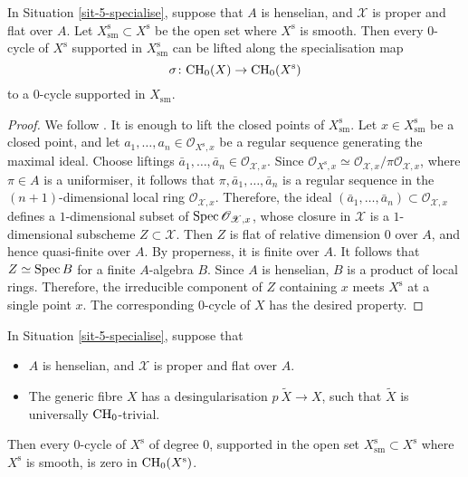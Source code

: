 \begin{lemma} \label{lem-5-lifting}
    In Situation \textup{\ref{sit-5-specialise}}, suppose that $A$ is henselian,
    and $\mathscr{X}$ is proper and flat over $A$.
    Let $X^{\mathrm{s}}_{\mathrm{sm}} \subset X^{\mathrm{s}}$ be the open set where $X^{\mathrm{s}}$ is smooth.
    Then every $0$-cycle of $X^{\mathrm{s}}$ supported in $X^{\mathrm{s}}_{\mathrm{sm}}$ 
    can be lifted along the specialisation map
    \[ \sigma \colon \mathrm{CH}_0 (X) \to \mathrm{CH}_0 (X^{\mathrm{s}}) \]
    to a $0$-cycle supported in $X_{\mathrm{sm}}$.
\end{lemma}

\begin{proof}
    We follow \cite[\S4]{EKW}.
    It is enough to lift the closed points of $X^{\mathrm{s}}_{\mathrm{sm}}$.
    Let $x \in X^{\mathrm{s}}_{\mathrm{sm}}$ be a closed point,
    and let $a_1, \dotsc, a_n \in \mathscr{O}_{X^{\mathrm{s}},x}$ be a regular sequence generating the maximal ideal.
    Choose liftings $\bar{a}_1, \dotsc, \bar{a}_n \in \mathscr{O}_{\mathscr{X},x}$.
    Since $\mathscr{O}_{X^{\mathrm{s}},x} \simeq \mathscr{O}_{\mathscr{X},x} / \pi \mathscr{O}_{\mathscr{X},x}$,
    where $\pi \in A$ is a uniformiser,
    it follows that $\pi, \bar{a}_1, \dotsc, \bar{a}_n$ is a regular sequence in 
    the $(n+1)$-dimensional local ring $\mathscr{O}_{\mathscr{X},x}$.
    Therefore, the ideal $(\bar{a}_1, \dotsc, \bar{a}_n) \subset \mathscr{O}_{\mathscr{X},x}$
    defines a $1$-dimensional subset of $\operatorname{Spec} \mathscr{O}_{\mathscr{X},x}$,
    whose closure in $\mathscr{X}$ is a $1$-dimensional subscheme $Z \subset \mathscr{X}$.
    Then $Z$ is flat of relative dimension $0$ over $A$,
    and hence quasi-finite over $A$. By properness, it is finite over $A$.
    It follows that $Z \simeq \operatorname{Spec} B$ for a finite $A$-algebra $B$.
    Since $A$ is henselian, $B$ is a product of local rings.
    Therefore, the irreducible component of $Z$ containing $x$
    meets $X^{\mathrm{s}}$ at a single point $x$.
    The corresponding $0$-cycle of $X$ has the desired property.
\end{proof}

\begin{lemma} \label{lem-5-henselian}
    In Situation \textup{\ref{sit-5-specialise}}, suppose that
    \begin{itemize}
        \item
            $A$ is henselian, and $\mathscr{X}$ is proper and flat over $A$.
        \item
            The generic fibre $X$ has a desingularisation $p \: \widetilde{X} \to X$,
            such that $\widetilde{X}$ is universally $\mathrm{CH}_0$-trivial.
    \end{itemize}
    Then every $0$-cycle of $X^{\mathrm{s}}$ of degree $0$,
    supported in the open set $X^{\mathrm{s}}_{\mathrm{sm}} \subset X^{\mathrm{s}}$ where $X^{\mathrm{s}}$ is smooth,
    is zero in $\mathrm{CH}_0 (X^{\mathrm{s}})$.
\end{lemma}


